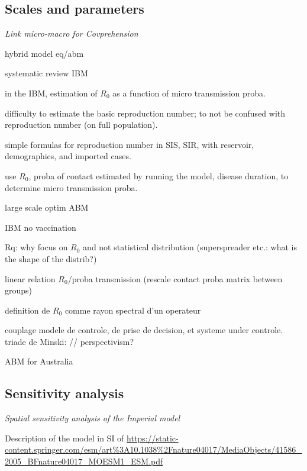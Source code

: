 \documentclass[10pt]{article}
\begin{document}
\subsection{Scales and parameters}

\textit{Link micro-macro for Covprehension}

\cite{hunter2020hybrid} hybrid model eq/abm

\cite{willem2017lessons} systematic review IBM

\cite{kuylen2017social} in the IBM, estimation of $R_0$ as a function of micro transmission proba.

\cite{delamater2019complexity} difficulty to estimate the basic reproduction number; to not be confused with reproduction number (on full population).

\cite{mclure2020some} simple formulas for reproduction number in SIS, SIR, with reservoir, demographics, and imported cases.

\cite{hunter2018open} use $R_0$, proba of contact estimated by running the model, disease duration, to determine micro transmission proba.

\cite{willem2015optimizing} large scale optim ABM  

\cite{kisjes2014individual} IBM no vaccination
	
Rq: why focus on $R_0$ and not statistical distribution (superspreader etc.: what is the shape of the distrib?)

\cite{chao2010flute} linear relation $R_0$/proba transmission (rescale contact proba matrix between groups)
	
\cite{bacaer2011parametre} definition de $R_0$ comme rayon spectral d'un operateur

\cite{bonte2011modelisation} couplage modele de controle, de prise de decision, et systeme under controle. triade de Minski: // perspectivism?

\cite{chang2020modelling} ABM for Australia

\cite{Nishi30285}

\subsection{Sensitivity analysis}

\textit{Spatial sensitivity analysis of the Imperial model}

Description of the model in SI of \cite{ferguson2005strategies}
\url{https://static-content.springer.com/esm/art\%3A10.1038\%2Fnature04017/MediaObjects/41586_2005_BFnature04017_MOESM1_ESM.pdf}
\end{document}
